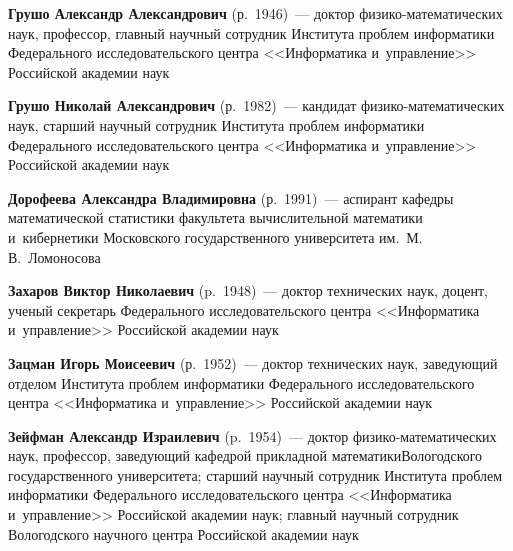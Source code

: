 \begin{multicols}{2}
\vspace*{3pt}


\noindent
\textbf{Грушо Александр Александрович} (р.\ 1946)~--- 
доктор фи\-зи\-ко-ма\-те\-ма\-ти\-че\-ских наук, профессор, главный научный 
со\-труд\-ник Института проб\-лем информатики Федерального исследовательского центра 
<<Информатика и~управ\-ле\-ние>> Российской академии наук

\columnbreak



\noindent
\textbf{Грушо Николай Александрович} (р.\ 1982)~--- 
кандидат фи\-зи\-ко-ма\-те\-ма\-ти\-че\-ских наук, старший научный со\-труд\-ник 
Института проб\-лем информатики Федерального исследовательского центра 
<<Информатика и~управ\-ле\-ние>> Российской академии наук


\vspace*{3pt}


\noindent
\textbf{Дорофеева Александра Владимировна} (р.\ 1991)~--- 
аспирант кафедры математической статистики факультета вычислительной математики 
и~кибернетики Московского государственного университета им.\ М.\,В.~Ломоносова

\vspace*{3pt}


\noindent
\textbf{Захаров Виктор Николаевич} (p.\ 1948)~--- 
доктор технических наук, доцент, ученый секретарь Федерального 
исследовательского центра <<Информатика и~управ\-ле\-ние>> Российской академии наук

\vspace*{3pt}


\noindent
\textbf{Зацман Игорь Моисеевич} (р.\ 1952)~--- 
доктор тех\-нических наук, за\-ве\-ду\-ющий отделом Института проб\-лем 
информатики Федерального исследовательского центра <<Информатика и~управ\-ле\-ние>> 
Российской академии наук

\vspace*{3pt}


\noindent
\textbf{Зейфман Александр Израилевич} (p.\ 1954)~--- 
доктор фи\-зи\-ко-ма\-те\-ма\-ти\-че\-ских наук, профессор, за\-ве\-ду\-ющий 
кафедрой прикладной математики\linebreak Вологодского государственного университета; 
старший на\-уч\-ный сотрудник Института проб\-лем информатики Федерального 
исследовательского центра <<Информатика и~управ\-ле\-ние>> 
Российской академии наук; главный научный сотрудник Вологодского 
научного центра Российской академии наук


\end{multicols}

